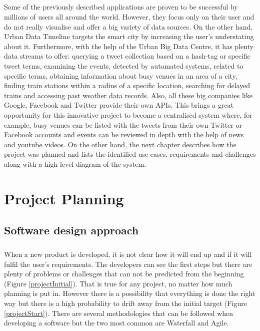 \documentclass{l4proj}
\begin{document}
\paragraph{}
Some of the previously described applications are proven to be successful by millions of users all around the world. However, they focus only on their user and do not really visualise and offer a big variety of data sources. On the other hand, Urban Data Timeline targets the smart city by increasing the user's understating about it. Furthermore, with the help of the Urban Big Data Centre, it has plenty data streams to offer: querying a tweet collection based on a hash-tag or specific tweet terms, examining the events, detected by automated systems, related to specific terms, obtaining information about busy venues in an area of a city, finding train stations within a radius of a specific location, searching for delayed trains and accessing past weather data records. Also, all these big companies like Google, Facebook and Twitter provide their own APIs. This brings a great opportunity for this innovative project to become a centralised system where, for example, busy venues can be listed with the tweets from their own Twitter or Facebook accounts and events can be reviewed in depth with the help of news and youtube videos. On the other hand, the next chapter describes how the project was planned and lists the identified use cases, requirements and challenges along with a high level diagram of the system. 


\chapter{Project Planning}

\section{Software design approach}
\paragraph{}
When a new product is developed, it is not clear how it will end up and if it will fulfil the user's requirements. The developers can see the first steps but there are plenty of problems or challenges that can not be predicted from the beginning (Figure \ref{projectInitial}). That is true for any project, no matter how much planning is put in. However there is a possibility that everything is done the right way but there is a high probability to drift away from the initial target (Figure \ref{projectStart}). There are several methodologies that can be followed when developing a software but the two most common are Waterfall and Agile. 
\end{document}
